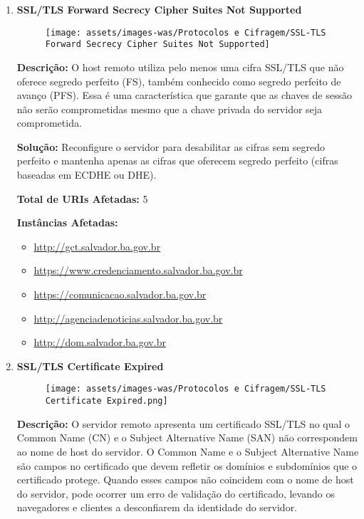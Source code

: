 \documentclass[a4paper,12pt]{article}
\begin{document}
\begin{enumerate}
\item \textbf{SSL/TLS Forward Secrecy Cipher Suites Not Supported}

                        \begin{figure}[h!]
                        \centering
                        \texttt{[image: assets/images-was/Protocolos e Cifragem/SSL-TLS Forward Secrecy Cipher Suites Not Supported]}
                        \end{figure}
                        \FloatBarrier
                        \textbf{Descrição:} O host remoto utiliza pelo menos uma cifra SSL/TLS que não oferece segredo perfeito (FS), também conhecido como segredo perfeito de avanço (PFS). Essa é uma característica que garante que as chaves de sessão não serão comprometidas mesmo que a chave privada do servidor seja comprometida.


\textbf{Solução:} Reconfigure o servidor para desabilitar as cifras sem segredo perfeito e mantenha apenas as cifras que oferecem segredo perfeito (cifras baseadas em ECDHE ou DHE).

\textbf{Total de URIs Afetadas:} 5

\textbf{Instâncias Afetadas:}
\begin{itemize}
    \item \url{http://gct.salvador.ba.gov.br}
    \item \url{https://www.credenciamento.salvador.ba.gov.br}
    \item \url{https://comunicacao.salvador.ba.gov.br}
    \item \url{http://agenciadenoticias.salvador.ba.gov.br}
    \item \url{http://dom.salvador.ba.gov.br}
\end{itemize}

\item \textbf{SSL/TLS Certificate Expired}

                        \begin{figure}[h!]
                        \centering
                        \texttt{[image: assets/images-was/Protocolos e Cifragem/SSL-TLS Certificate Expired.png]}
                        \end{figure}
                        \FloatBarrier
                        \textbf{Descrição:} O servidor remoto apresenta um certificado SSL/TLS no qual o Common Name (CN) e o Subject Alternative Name (SAN) não correspondem ao nome de host do servidor. O Common Name e o Subject Alternative Name são campos no certificado que devem refletir os domínios e subdomínios que o certificado protege. Quando esses campos não coincidem com o nome de host do servidor, pode ocorrer um erro de validação do certificado, levando os navegadores e clientes a desconfiarem da identidade do servidor.


\end{enumerate}
\end{document}
